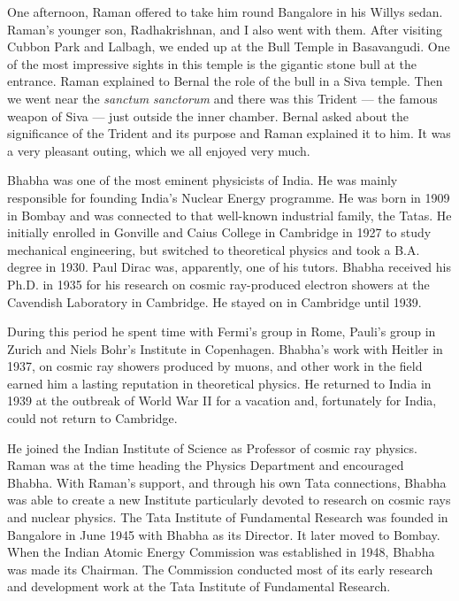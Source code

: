 One afternoon, Raman offered to take him round Bangalore
in his Willys sedan. Raman's younger son, Radhakrishnan, and
I also went with them. After visiting Cubbon Park and Lalbagh,
we ended up at the Bull Temple in Basavangudi. One of the most
impressive sights in this temple is the gigantic stone bull at the
entrance. Raman explained to Bernal the role of the bull in a
Siva temple. Then we went near the {\em sanctum sanctorum} and there
was this Trident --- the famous weapon of Siva --- just outside
the inner chamber. Bernal asked about the significance of the
Trident and its purpose and Raman explained it to him. It was
a very pleasant outing, which we all enjoyed very much.

\medskip
{}
\smallskip

\noindent
Bhabha was one of the most eminent physicists of India.
He was mainly responsible for founding India's Nuclear Energy
programme. He was born in 1909 in Bombay and was connected
to that well-known industrial family, the Tatas. He initially
enrolled in Gonville and Caius College in Cambridge in 1927 to
study mechanical engineering, but switched to theoretical physics
and took a B.A. degree in 1930. Paul Dirac was, apparently, one
of his tutors. Bhabha received his Ph.D. in 1935 for his research
on cosmic ray-produced electron showers at the Cavendish
Laboratory in Cambridge. He stayed on in Cambridge until 1939.

During this period he spent time with Fermi's group in Rome,
Pauli's group in Zurich and Niels Bohr's Institute in Copenhagen.
Bhabha's work with Heitler in 1937, on cosmic ray showers
produced by muons, and other work in the field earned him a
lasting reputation in theoretical physics. He returned to India in
1939 at the outbreak of World War II for a vacation and,
fortunately for India, could not return to Cambridge.

He joined the Indian Institute of Science as Professor of
cosmic ray physics. Raman was at the time heading the Physics
Department and encouraged Bhabha. With Raman's support, and
through his own Tata connections, Bhabha was able to create
a new Institute particularly devoted to research on cosmic rays
and nuclear physics. The Tata Institute of Fundamental Research
was founded in Bangalore in June 1945 with Bhabha as its
Director. It later moved to Bombay. When the Indian Atomic
Energy Commission was established in 1948, Bhabha was made
its Chairman. The Commission conducted most of its early
research and development work at the Tata Institute of Fundamental Research.

